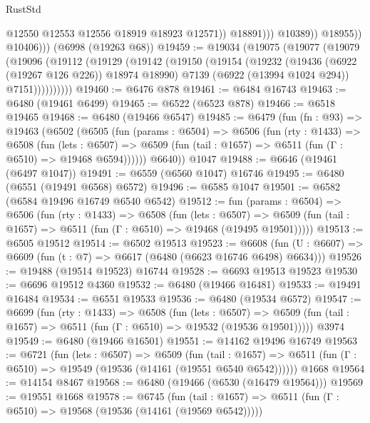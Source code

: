 \begin{lexlean}{RustStd}
\begin{coremodule}
                            @12550
                            @12553
                            @12556
                            @18919
                            @18923
                            @12571))
                        @18891)))
                  @10389))
              @18955))
          @10406)))
    (@6998 (@19263 @68))
@19459 := @19034
    (@19075
      (@19077
        (@19079
          (@19096
            (@19112
              (@19129
                (@19142
                  (@19150
                    (@19154
                      (@19232
                        (@19436 (@6922 (@19267 @126 @226)) @18974 @18990)
                        @7139
                        (@6922 (@13994 @1024 @294))
                        @7151))))))))))
@19460 := @6476 @878
@19461 := @6484 @16743
@19463 := @6480 (@19461 @6499)
@19465 := @6522 (@6523 @878)
@19466 := @6518 @19465
@19468 := @6480 (@19466 @6547)
@19485 := @6479
    (fun (fn : @93) =>
    @19463
      (@6502
        (@6505
          (fun (params : @6504) =>
          @6506
            (fun (rty : @1433) =>
            @6508
              (fun (lets : @6507) =>
              @6509 (fun (tail : @1657) => @6511 (fun (Γ : @6510) => @19468 @6594))))))
        @6640))
    @1047
@19488 := @6646 (@19461 (@6497 @1047))
@19491 := @6559 (@6560 @1047) @16746
@19495 := @6480 (@6551 (@19491 @6568) @6572)
@19496 := @6585 @1047
@19501 := @6582 (@6584 @19496 @16749 @6540 @6542)
@19512 := fun (params : @6504) =>
  @6506
    (fun (rty : @1433) =>
    @6508
      (fun (lets : @6507) =>
      @6509 (fun (tail : @1657) => @6511 (fun (Γ : @6510) => @19468 (@19495 @19501)))))
@19513 := @6505 @19512
@19514 := @6502 @19513
@19523 := @6608
    (fun (U : @6607) => @6609 (fun (t : @7) => @6617 (@6480 (@6623 @16746 @6498) @6634)))
@19526 := @19488 (@19514 @19523) @16744
@19528 := @6693 @19513 @19523
@19530 := @6696 @19512 @4360
@19532 := @6480 (@19466 @16481)
@19533 := @19491 @16484
@19534 := @6551 @19533
@19536 := @6480 (@19534 @6572)
@19547 := @6699
    (fun (rty : @1433) =>
    @6508
      (fun (lets : @6507) =>
      @6509 (fun (tail : @1657) => @6511 (fun (Γ : @6510) => @19532 (@19536 @19501)))))
    @3974
@19549 := @6480 (@19466 @16501)
@19551 := @14162 @19496 @16749
@19563 := @6721
    (fun (lets : @6507) =>
    @6509
      (fun (tail : @1657) =>
      @6511 (fun (Γ : @6510) => @19549 (@19536 (@14161 (@19551 @6540 @6542))))))
    @1668
@19564 := @14154 @8467
@19568 := @6480 (@19466 (@6530 (@16479 @19564)))
@19569 := @19551 @1668
@19578 := @6745
    (fun (tail : @1657) => @6511 (fun (Γ : @6510) => @19568 (@19536 (@14161 (@19569 @6542)))))

\end{coremodule}
\end{lexlean}
